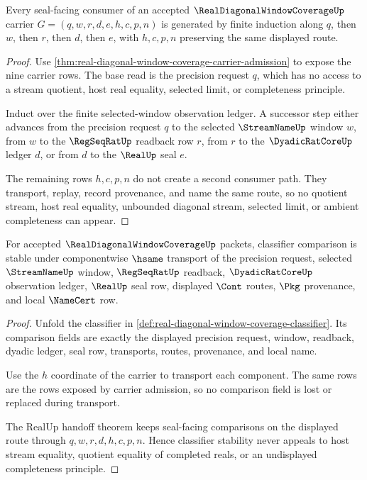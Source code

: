 \begin{theorem}
\label{thm:real-diagonal-window-coverage-induction}
Every seal-facing consumer of an accepted $\RealDiagonalWindowCoverageUp$ carrier $G=(q,w,r,d,e,h,c,p,n)$ is generated by finite induction along $q$, then $w$, then $r$, then $d$, then $e$, with $h,c,p,n$ preserving the same displayed route.
\end{theorem}
\begin{proof}
Use \autoref{thm:real-diagonal-window-coverage-carrier-admission} to expose the nine carrier rows. The base read is the precision request $q$, which has no access to a stream quotient, host real equality, selected limit, or completeness principle.

Induct over the finite selected-window observation ledger. A successor step either advances from the precision request $q$ to the selected $\StreamNameUp$ window $w$, from $w$ to the $\RegSeqRatUp$ readback row $r$, from $r$ to the $\DyadicRatCoreUp$ ledger $d$, or from $d$ to the $\RealUp$ seal $e$.

The remaining rows $h,c,p,n$ do not create a second consumer path. They transport, replay, record provenance, and name the same route, so no quotient stream, host real equality, unbounded diagonal stream, selected limit, or ambient completeness can appear.
\end{proof}

\begin{theorem}
\label{thm:real-diagonal-window-coverage-classifier-stability}
For accepted $\RealDiagonalWindowCoverageUp$ packets, classifier comparison is stable under componentwise $\hsame$ transport of the precision request, selected $\StreamNameUp$ window, $\RegSeqRatUp$ readback, $\DyadicRatCoreUp$ observation ledger, $\RealUp$ seal row, displayed $\Cont$ routes, $\Pkg$ provenance, and local $\NameCert$ row.
\end{theorem}
\begin{proof}
Unfold the classifier in \autoref{def:real-diagonal-window-coverage-classifier}. Its comparison fields are exactly the displayed precision request, window, readback, dyadic ledger, seal row, transports, routes, provenance, and local name.

Use the $h$ coordinate of the carrier to transport each component. The same rows are the rows exposed by carrier admission, so no comparison field is lost or replaced during transport.

The RealUp handoff theorem keeps seal-facing comparisons on the displayed route through $q,w,r,d,h,c,p,n$. Hence classifier stability never appeals to host stream equality, quotient equality of completed reals, or an undisplayed completeness principle.
\end{proof}

